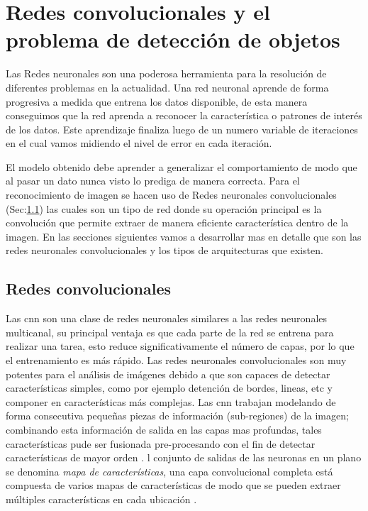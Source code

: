 \section{Redes convolucionales y el problema de detección de objetos}\label{sec:compueter-vision}

Las Redes neuronales son una poderosa herramienta para la resolución de diferentes problemas en la actualidad. Una red neuronal aprende de forma progresiva a medida que entrena los datos disponible, de esta manera conseguimos que la red aprenda a reconocer la característica o patrones de interés de los datos. Este aprendizaje finaliza luego de un numero variable de iteraciones en el cual vamos midiendo el nivel de error en cada iteración.

El modelo obtenido debe aprender a generalizar el comportamiento de modo que al pasar un dato nunca visto lo prediga de manera correcta. Para el reconocimiento de imagen se hacen uso de Redes neuronales convolucionales (Sec:\ref{sub:cnn}) las cuales son un tipo de red donde su operación principal es la convolución que permite extraer de manera eficiente característica dentro de la imagen. En las secciones siguientes vamos a desarrollar mas en detalle que son las redes neuronales convolucionales y los tipos de arquitecturas que existen. 


\subsection{Redes convolucionales}\label{sub:cnn}

Las \ac{cnn} son una clase de redes neuronales  similares a las redes neuronales multicanal, su principal ventaja es que cada parte de la red se entrena para realizar una tarea, esto reduce significativamente el número de capas, por lo que el entrenamiento es más rápido. Las redes neuronales convolucionales son muy potentes para el análisis de imágenes debido a que son capaces de detectar características simples, como por ejemplo detención de bordes, lineas, etc y componer en características más complejas. Las \ac{cnn} trabajan modelando de forma consecutiva pequeñas piezas de información (sub-regiones) de la imagen; combinando esta información de salida en las capas mas profundas, tales características pude ser fusionada pre-procesando con el fin de detectar características de mayor orden \citep{murphy}. l conjunto de salidas de las neuronas en un plano se denomina \textit{mapa de características}, una capa convolucional completa está compuesta de varios mapas de características de modo que se pueden extraer múltiples características en cada ubicación \citep{cnns}.

